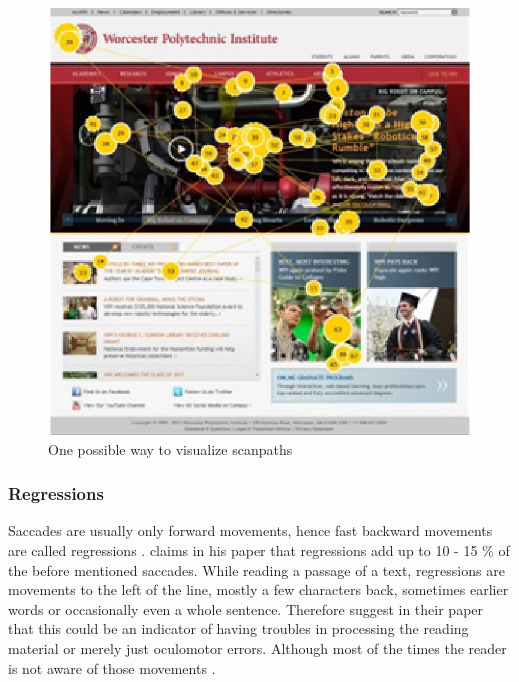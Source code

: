 \begin{figure}[!ht]
    \centering
    \includegraphics[width=0.75\linewidth]{images/scanpath_djamasbi2014eye.png}
    \caption{
       One possible way to visualize scanpaths \autocite[43]{djamasbi2014eye}
    }
    \label{figure:Scanpath}
\end{figure}

\subsubsection{Regressions}
Saccades are usually only forward movements, hence fast backward movements are called regressions \autocite[]{reichle1998toward}. 
\textcite[]{rayner1998eye} claims in his paper that regressions add up to 10 - 15 \% of the before mentioned saccades.
While reading a passage of a text, regressions are movements to the left of the line, mostly a few characters back, sometimes earlier words or occasionally even a whole sentence. Therefore \textcite[]{kruger2014subtitles} suggest in their paper that this could be an indicator of having troubles in processing the reading material or merely just oculomotor errors. Although most of the times the reader is not aware of those movements \autocite[]{reichle2003ez, biedert2010eyebook}.

